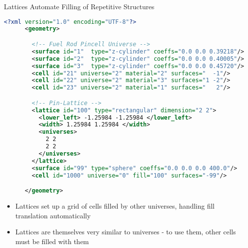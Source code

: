 \begin{frame}[fragile]{Lattices Automate Filling of Repetitive Structures}

  \begin{scriptsize}
    \begin{lstlisting}[language=XML,gobble=4]
      <?xml version="1.0" encoding="UTF-8"?>
      <geometry>

        <!-- Fuel Rod Pincell Universe -->
        <surface id="1"  type="z-cylinder" coeffs="0.0 0.0 0.39218"/>     <!-- fuel OR   -->
        <surface id="2"  type="z-cylinder" coeffs="0.0 0.0 0.40005"/>     <!-- gap OR    -->
        <surface id="3"  type="z-cylinder" coeffs="0.0 0.0 0.45720"/>     <!-- clad OR   -->
        <cell id="21" universe="2" material="2" surfaces="  -1"/>         <!-- fuel  -->
        <cell id="22" universe="2" material="3" surfaces="1 -2"/>         <!-- clad  -->
        <cell id="23" universe="2" material="1" surfaces="   2"/>         <!-- water -->

        <!-- Pin-Lattice -->
        <lattice id="100" type="rectangular" dimension="2 2">
          <lower_left> -1.25984 -1.25984 </lower_left>
          <width> 1.25984 1.25984 </width>
          <universes>
            2 2
            2 2
          </universes>
        </lattice>
        <surface id="99" type="sphere" coeffs="0.0 0.0 0.0 400.0"/>
        <cell id="1000" universe="0" fill="100" surfaces="-99"/>

      </geometry>
    \end{lstlisting}
  \end{scriptsize}


  \begin{itemize}
    \item \small Lattices set up a grid of cells filled by other universes, handling
    fill translation automatically
    \item \small Lattices are themselves very similar to universes - to use them, other
    cells must be filled with them
  \end{itemize}
  
  
  
\end{frame}

